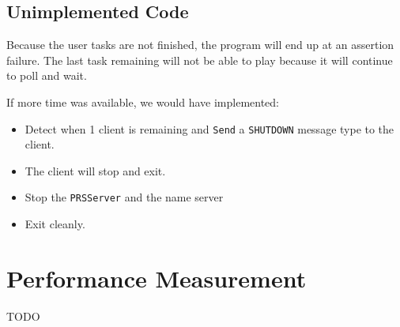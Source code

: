 \documentclass[letterpaper, 12pt]{article}
\begin{document}
\subsection{Unimplemented Code%
  \label{unimplemented-code}%
}

Because the user tasks are not finished, the program will end up at an assertion failure. The last task remaining will not be able to play because it will continue to poll and wait.

If more time was available, we would have implemented:
%
\begin{itemize}

\item Detect when 1 client is remaining and \texttt{Send} a \texttt{SHUTDOWN} message type to the client.

\item The client will stop and exit.

\item Stop the \texttt{PRSServer} and the name server

\item Exit cleanly.

\end{itemize}


\section{Performance Measurement%
  \label{performance-measurement}%
}

TODO
\end{document}
